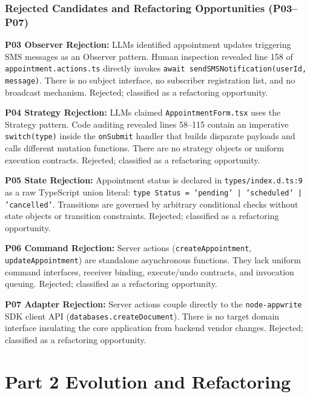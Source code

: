 \documentclass[11pt,a4paper]{article}
\newcommand{\entry}[2]{\textbf{#1:} #2\par}
\begin{document}
\subsubsection{Rejected Candidates and Refactoring Opportunities (P03--P07)}
\entry{P03 Observer Rejection}{LLMs identified appointment updates triggering SMS messages as an Observer pattern. Human inspection revealed line 158 of \texttt{appointment.actions.ts} directly invokes \texttt{await sendSMSNotification(userId, message)}. There is no subject interface, no subscriber registration list, and no broadcast mechanism. Rejected; classified as a refactoring opportunity.}
\entry{P04 Strategy Rejection}{LLMs claimed \texttt{AppointmentForm.tsx} uses the Strategy pattern. Code auditing revealed lines 58--115 contain an imperative \texttt{switch(type)} inside the \texttt{onSubmit} handler that builds disparate payloads and calls different mutation functions. There are no strategy objects or uniform execution contracts. Rejected; classified as a refactoring opportunity.}
\entry{P05 State Rejection}{Appointment status is declared in \texttt{types/index.d.ts:9} as a raw TypeScript union literal: \texttt{type Status = 'pending' | 'scheduled' | 'cancelled'}. Transitions are governed by arbitrary conditional checks without state objects or transition constraints. Rejected; classified as a refactoring opportunity.}
\entry{P06 Command Rejection}{Server actions (\texttt{createAppointment}, \texttt{updateAppointment}) are standalone asynchronous functions. They lack uniform command interfaces, receiver binding, execute/undo contracts, and invocation queuing. Rejected; classified as a refactoring opportunity.}
\entry{P07 Adapter Rejection}{Server actions couple directly to the \texttt{node-appwrite} SDK client API (\texttt{databases.createDocument}). There is no target domain interface insulating the core application from backend vendor changes. Rejected; classified as a refactoring opportunity.}

\section{Part 2 Evolution and Refactoring}
\end{document}
